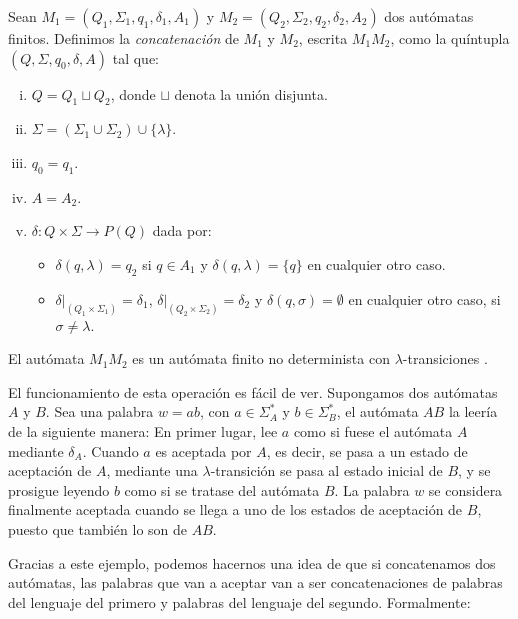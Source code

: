 \begin{definicion}\label{def:concat-auto}Sean $M_1=(Q_1,\Sigma_1,q_1,\delta_1,A_1)$ y 
$M_2=(Q_2,\Sigma_2,q_2,\delta_2,A_2)$ dos autómatas finitos. Definimos la \textit{concatenación} de $M_1$ y $M_2$,
escrita $M_1M_2$, como la quíntupla $(Q,\Sigma,q_0,\delta,A)$ tal que:
\begin{enumerate}[(i)]
    \item $Q=Q_1\sqcup Q_2$, donde $\sqcup$ denota la unión disjunta.
    \item $\Sigma=(\Sigma_1\cup\Sigma_2)\cup\{\lambda\}$.
    \item $q_0=q_1$.
    \item $A=A_2$.
    \item $\delta:Q\times\Sigma\to P(Q)$ dada por:
    \begin{itemize}
        \item $\delta(q,\lambda)=q_2$ si $q\in A_1$ y $\delta(q,\lambda)=\{q\}$ en cualquier otro caso.
        \item $\delta|_{(Q_1\times\Sigma_1)}=\delta_1$, $\delta|_{(Q_2\times\Sigma_2)}=\delta_2$ y 
        $\delta(q,\sigma)=\emptyset$ en cualquier otro caso, si $\sigma\neq\lambda$.
    \end{itemize}
\end{enumerate}
El autómata $M_1M_2$ es un autómata finito no determinista con $\lambda$-transiciones \cite{juxt_auto}.
\end{definicion}

El funcionamiento de esta operación es fácil de ver. Supongamos dos autómatas $A$ y $B$. Sea una palabra $w=ab$, con
$a\in\Sigma_A^*$ y $b\in\Sigma_B^*$, el autómata $AB$ la leería de la siguiente manera: En primer lugar, lee $a$ como
si fuese el autómata $A$ mediante $\delta_A$. Cuando $a$ es aceptada por $A$, es decir, se pasa a un estado de
aceptación de $A$, mediante una $\lambda$-transición se pasa al estado inicial de $B$, y se prosigue leyendo $b$ como
si se tratase del autómata $B$. La palabra $w$ se considera finalmente aceptada cuando se llega a uno de los estados
de aceptación de $B$, puesto que también lo son de $AB$.

\vspace{10pt}
Gracias a este ejemplo, podemos hacernos una idea de que si concatenamos dos autómatas, las palabras que van a aceptar
van a ser concatenaciones de palabras del lenguaje del primero y palabras del lenguaje del segundo. Formalmente:

